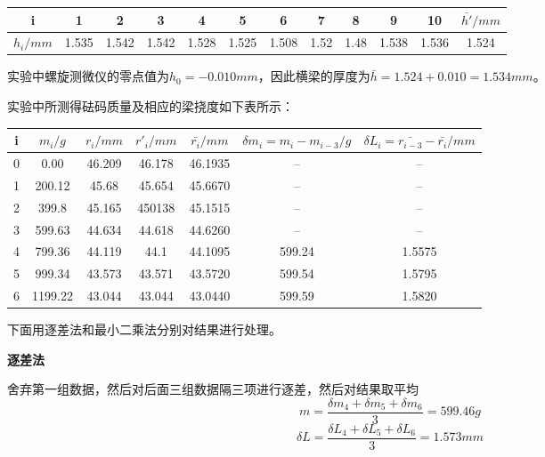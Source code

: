 \documentclass{article}
\begin{document}
    \begin{center}
        \begin{tabular}{|c|c|c|c|c|c|c|c|c|c|c|c|}
            \hline
            i     & 1     & 2     & 3     & 4     & 5     & 6     & 7     & 8     & 9     & 10    & $\bar{h'}/mm$ \bigstrut\\
            \hline
            $h_i/mm$ & 1.535 & 1.542 & 1.542 & 1.528 & 1.525 & 1.508 & 1.52  & 1.48  & 1.538 & 1.536 & 1.524 \bigstrut\\
            \hline
        \end{tabular}%
    \end{center}

    实验中螺旋测微仪的零点值为$h_0=-0.010mm$，因此横梁的厚度为$\bar{h}=1.524+0.010=1.534mm$。

    实验中所测得砝码质量及相应的梁挠度如下表所示：
    \begin{center}
        \begin{tabular}{|c|c|c|c|c|c|c|}
            \hline
            i     & $m_i/g$ & $r_i/mm$ & $r'_i/mm$ & $\bar{r_i}/mm$ & $\delta m_i = m_i-m_{i-3}/g$ & $\delta L_i=\bar{r_{i-3}}-\bar{r_{i}}/mm$  \bigstrut\\
            \hline
            0     & 0.00     & 46.209 & 46.178 & 46.1935 & -- & -- \bigstrut\\
            \hline
            1     & 200.12 & 45.68 & 45.654 & 45.6670 & -- & -- \bigstrut\\
            \hline
            2     & 399.8 & 45.165 & 450138 & 45.1515 & -- & -- \bigstrut\\
            \hline
            3     & 599.63 & 44.634 & 44.618 & 44.6260 & -- & -- \bigstrut\\
            \hline
            4     & 799.36 & 44.119 & 44.1  & 44.1095 & 599.24 & 1.5575\bigstrut\\
            \hline
            5     & 999.34 & 43.573 & 43.571 & 43.5720 & 599.54 & 1.5795\bigstrut\\
            \hline
            6     & 1199.22 & 43.044 & 43.044 & 43.0440 & 599.59 & 1.5820\bigstrut\\
            \hline
        \end{tabular}%
    \end{center}

    下面用逐差法和最小二乘法分别对结果进行处理。

    \textbf{逐差法}

    舍弃第一组数据，然后对后面三组数据隔三项进行逐差，然后对结果取平均
    $$m=\frac{\delta m_4+\delta m_5 + \delta m_6}{3}=599.46g$$
    $$\delta L=\frac{\delta L_4+\delta L_5+\delta L_6}{3}=1.573mm$$
\end{document}
